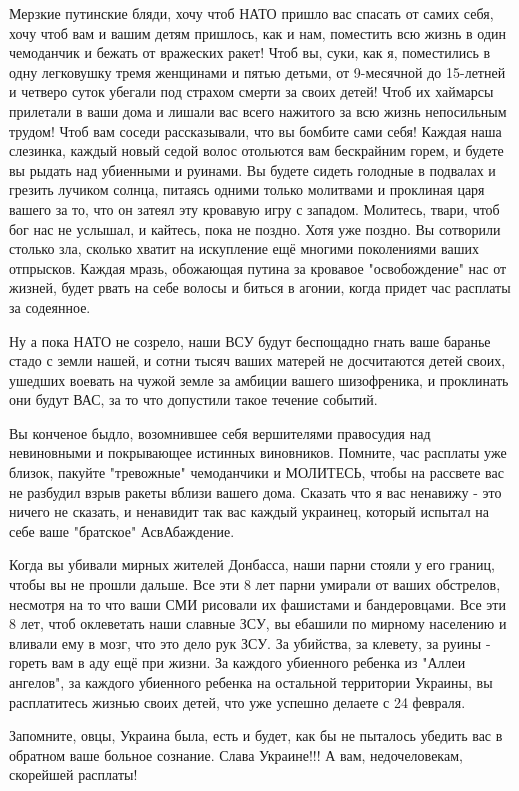  
 
 
 
 

Мерзкие путинские бляди, хочу чтоб НАТО пришло вас спасать от самих себя, хочу
чтоб вам и вашим детям пришлось, как и нам, поместить всю жизнь в один
чемоданчик и бежать от вражеских ракет! Чтоб вы, суки, как я, поместились в
одну легковушку тремя женщинами и пятью детьми, от 9-месячной до 15-летней и
четверо суток убегали под страхом смерти за своих детей! Чтоб их хаймарсы
прилетали в ваши дома и лишали вас всего нажитого за всю жизнь непосильным
трудом! Чтоб вам соседи рассказывали, что вы бомбите сами себя! Каждая наша
слезинка, каждый новый седой волос отольются вам бескрайним горем, и будете вы
рыдать над убиенными и руинами. Вы будете сидеть голодные в подвалах и грезить
лучиком солнца, питаясь одними только молитвами и проклиная царя вашего за то,
что он затеял эту кровавую игру с западом. Молитесь, твари, чтоб бог нас не
услышал, и кайтесь, пока не поздно. Хотя уже поздно. Вы сотворили столько зла,
сколько хватит на искупление ещё многими поколениями ваших отпрысков. Каждая
мразь, обожающая путина за кровавое "освобождение" нас от жизней, будет рвать
на себе волосы и биться в агонии, когда придет час расплаты за содеянное. 

Ну а пока НАТО не созрело, наши ВСУ будут беспощадно гнать ваше баранье стадо с
земли нашей, и сотни тысяч ваших матерей не досчитаются детей своих, ушедших
воевать на чужой земле за амбиции вашего шизофреника, и проклинать они будут
ВАС, за то что допустили такое течение событий. 

Вы конченое быдло, возомнившее себя вершителями правосудия над невиновными и
покрывающее истинных виновников. Помните, час расплаты уже близок, пакуйте
"тревожные" чемоданчики и МОЛИТЕСЬ, чтобы на рассвете вас не разбудил взрыв
ракеты вблизи вашего дома. Сказать что я вас ненавижу - это ничего не сказать,
и ненавидит так вас каждый украинец, который испытал на себе ваше "братское"
АсвАбаждение. 

Когда вы убивали мирных жителей Донбасса, наши парни стояли у его границ, чтобы
вы не прошли дальше. Все эти 8 лет парни умирали от ваших обстрелов, несмотря
на то что ваши СМИ рисовали их фашистами и бандеровцами. Все эти 8 лет, чтоб
оклеветать наши славные ЗСУ, вы ебашили по мирному населению и вливали ему в
мозг, что это дело рук ЗСУ. За убийства, за клевету, за руины - гореть вам в
аду ещё при жизни.  За каждого убиенного ребенка из "Аллеи ангелов", за каждого
убиенного ребенка на остальной территории Украины, вы расплатитесь жизнью своих
детей, что уже успешно делаете с 24 февраля. 

Запомните, овцы, Украина была, есть и будет, как бы не пыталось убедить вас в
обратном ваше больное сознание. Слава Украине!!! А вам, недочеловекам,
скорейшей расплаты!
